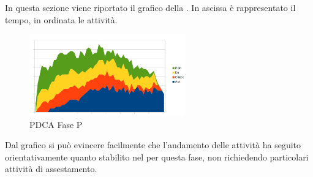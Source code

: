 In questa sezione viene riportato il grafico  della . In ascissa è rappresentato il tempo, in ordinata le attività.
\begin{figure}[H]
	\centering
	\includegraphics[width=0.6\textwidth]{PianoDiQualifica/Pics/GraficoPDCAFaseP.png}
	\caption{PDCA Fase P}
\end{figure}
Dal grafico si può evincere facilmente che l'andamento delle attività ha seguito orientativamente quanto stabilito nel  per questa fase, non richiedendo particolari attività di assestamento.




							






